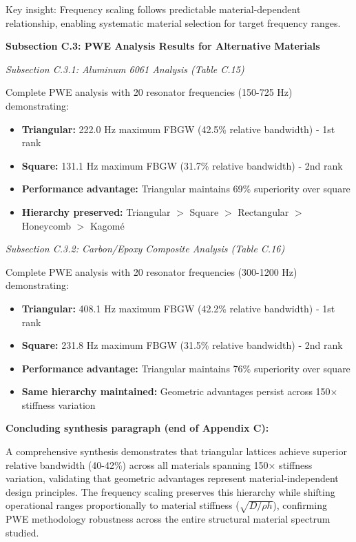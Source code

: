 \documentclass[11pt,a4paper]{article}
\newenvironment{changesbox}{%
    \par\medskip\noindent{\color{changescolor}\rule{\linewidth}{2pt}}\par
    \noindent{\color{changescolor}\bfseries Manuscript Changes}\par\smallskip
}{%
    \par\noindent{\color{changescolor}\rule{\linewidth}{0.5pt}}\medskip
}
\begin{document}
\begin{changesbox}
Key insight: Frequency scaling follows predictable material-dependent relationship, enabling systematic material selection for target frequency ranges.

\textbf{Subsection C.3: PWE Analysis Results for Alternative Materials}

\textit{Subsection C.3.1: Aluminum 6061 Analysis (Table C.15)}

Complete PWE analysis with 20 resonator frequencies (150-725 Hz) demonstrating:
\begin{itemize}
    \item \textbf{Triangular:} 222.0 Hz maximum FBGW (42.5\% relative bandwidth) - 1st rank
    \item \textbf{Square:} 131.1 Hz maximum FBGW (31.7\% relative bandwidth) - 2nd rank
    \item \textbf{Performance advantage:} Triangular maintains 69\% superiority over square
    \item \textbf{Hierarchy preserved:} Triangular $>$ Square $>$ Rectangular $>$ Honeycomb $>$ Kagom\'{e}
\end{itemize}

\textit{Subsection C.3.2: Carbon/Epoxy Composite Analysis (Table C.16)}

Complete PWE analysis with 20 resonator frequencies (300-1200 Hz) demonstrating:
\begin{itemize}
    \item \textbf{Triangular:} 408.1 Hz maximum FBGW (42.2\% relative bandwidth) - 1st rank
    \item \textbf{Square:} 231.8 Hz maximum FBGW (31.5\% relative bandwidth) - 2nd rank
    \item \textbf{Performance advantage:} Triangular maintains 76\% superiority over square
    \item \textbf{Same hierarchy maintained:} Geometric advantages persist across 150$\times$ stiffness variation
\end{itemize}

\textbf{Concluding synthesis paragraph (end of Appendix C):}

A comprehensive synthesis demonstrates that triangular lattices achieve superior relative bandwidth (40-42\%) across all materials spanning 150$\times$ stiffness variation, validating that geometric advantages represent material-independent design principles. The frequency scaling preserves this hierarchy while shifting operational ranges proportionally to material stiffness ($\sqrt{D/\rho h}$), confirming PWE methodology robustness across the entire structural material spectrum studied.


\end{changesbox}
\end{document}
